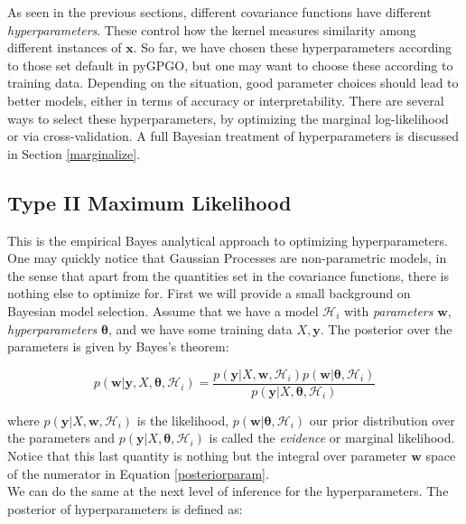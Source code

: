 \documentclass[10pt,a4paper,twoside]{book}
\begin{document}
As seen in the previous sections, different covariance functions have different \textit{hyperparameters}. These control how the kernel measures similarity among different instances of $\boldsymbol{x}$. So far, we have chosen these hyperparameters according to those set default in pyGPGO, but one may want to choose these according to training data. Depending on the situation, good parameter choices should lead to better models, either in terms of accuracy or interpretability. There are several ways to select these hyperparameters, by optimizing the marginal log-likelihood or via cross-validation. A full Bayesian treatment of hyperparameters is discussed in Section \ref{marginalize}.

\subsection{Type II Maximum Likelihood}
\label{empbayes}

This is the empirical Bayes \cite{Rossi2006} analytical approach to optimizing hyperparameters. One may quickly notice that Gaussian Processes are non-parametric models, in the sense that apart from the quantities set in the covariance functions, there is nothing else to optimize for. First we will provide a small background on Bayesian model selection. Assume that we have a model  $\mathcal{H}_i$ with \textit{parameters} $\boldsymbol{w}$, \textit{hyperparameters} $\boldsymbol{\theta}$, and we have some training data $X, \boldsymbol{y}$. The posterior over the parameters is given by Bayes's theorem:

\begin{equation}
\label{posteriorparam}
p(\boldsymbol{w}|\boldsymbol{y}, X, \boldsymbol{\theta}, \mathcal{H}_i) = \dfrac{p(\boldsymbol{y}|X, \boldsymbol{w}, \mathcal{H}_i)p(\boldsymbol{w}|\boldsymbol{\theta}, \mathcal{H}_i)}{p(\boldsymbol{y}|X, \boldsymbol{\theta}, \mathcal{H}_i)}
\end{equation}

where $p(\boldsymbol{y}|X, \boldsymbol{w}, \mathcal{H}_i)$ is the likelihood, $p(\boldsymbol{w}|\boldsymbol{\theta}, \mathcal{H}_i)$ our prior distribution over the parameters and $p(\boldsymbol{y}|X, \boldsymbol{\theta}, \mathcal{H}_i)$ is called the \textit{evidence} or marginal likelihood. Notice that this last quantity is nothing but the integral over parameter $\boldsymbol{w}$ space of the numerator in Equation \ref{posteriorparam}.\\

We can do the same at the next level of inference for the hyperparameters. The posterior of hyperparameters is defined as:
\end{document}
